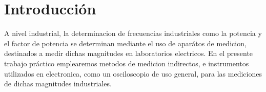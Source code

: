 \section{Introducción}

   A nivel industrial, la determinacion de frecuencias industriales como la potencia y el factor de potencia se 
   determinan mediante el uso de aparátos de medicion, destinados a medir dichas magnitudes 
   en laboratorios electricos. En el presente trabajo práctico emplearemos metodos de medicion 
   indirectos, e instrumentos utilizados en electronica, como un osciloscopio de uso general, 
   para las mediciones de dichas magnitudes industriales.   

